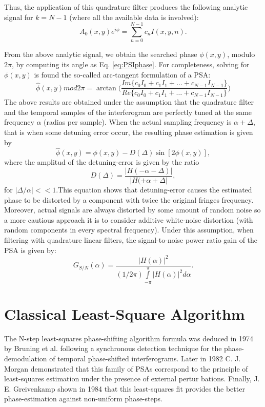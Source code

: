 Thus, the application of this quadrature filter produces the following analytic
signal for $k = N-1$ (where all the available data is involved):
\begin{equation}
 A_0(x,y)e^{i\phi}=\sum^{N-1}_{n=0} c_n I(x,y,n).
\end{equation}

From the above analytic signal, we obtain the searched phase $\phi(x,y)$, modulo
$2\pi$, by computing its angle as Eq. \eqref{eq:PSIphase}. For completeness, 
solving for $\phi(x,y)$ is found the so-called arc-tangent formulation of a PSA:
\begin{equation}
 \hat{\phi}(x,y) mod 2\pi= \arctan \Bigg(\frac{Im\{c_0I_0+c_1I_1 + \dots + c_{N-1}
I_{N-1}\}}{Re\{c_0I_0+c_1I_1 + \dots + c_{N-1} I_{N-1}\}}  \Bigg)
\end{equation}
The above results are obtained under the assumption that the quadrature filter
and the temporal samples of the interferogram are perfectly tuned at the same
frequency $\alpha$ (radias per sample). When the actual sampling frequency is
$\alpha+\Delta$, that is when some detuning error occur, the resulting phase 
estimation is given by
\begin{equation}
 \hat{\phi}(x,y)=\phi(x,y)-D(\Delta)\sin[2\phi(x,y)],
\end{equation}
where the amplitud of the detuning-error is given by the ratio
\begin{equation}
 D(\Delta)=\frac{|H(-\alpha-\Delta)|}{|H(+\alpha+\Delta|},
\end{equation}
for $|\Delta/\alpha|<<1$.This equation shows that detuning-error causes the 
estimated phase to be distorted by a component with twice the original fringes 
frequency. Moreover, actual signals are always distorted by some amount of random
noise so a more cautious approach it is to consider additive white-noise 
distortion (with random components in every spectral frequency). Under this 
assumption, when filtering with quadrature linear filters, the signal-to-noise 
power ratio gain of the PSA is given by:
\begin{equation}
 G_{S/N}(\alpha)=\frac{|H(\alpha)|^2}{(1/2\pi)\int\limits_{-\pi}^{\pi}
|H(\alpha)|^2 d\alpha}.
\end{equation}

\section{Classical Least-Square Algorithm}

The N-step least-squares phase-shifting algorithm formula was deduced in
1974 by Bruning et al. \cite{Bruning:74} following a synchronous detection 
technique for the phase-demodulation of temporal phase-shifted interferograms. 
Later in 1982 C. J. Morgan \cite{Morgan} demonstrated that this family of PSAs 
correspond to the principle of least-squares estimation under the presence of 
external pertur bations. Finally, J. E. Greivenkamp \cite{Greivenkamp} shown in 
1984 that this least-squares fit provides the better phase-estimation against 
non-uniform phase-steps.

